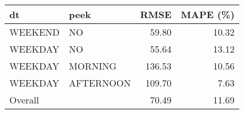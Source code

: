 \begin{tabular}{llrr}
 dt & peek & RMSE & MAPE (\%) \\ 
  \hline
\hline
WEEKEND & NO & 59.80 & 10.32 \\ 
   \hline
WEEKDAY & NO & 55.64 & 13.12 \\ 
   \hline
WEEKDAY & MORNING & 136.53 & 10.56 \\ 
   \hline
WEEKDAY & AFTERNOON & 109.70 & 7.63 \\ 
   \hline
\hline
Overall &  & 70.49 & 11.69 \\ 
  \end{tabular}
